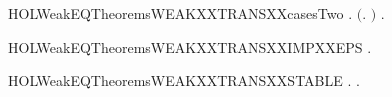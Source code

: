 \newcommand{\HOLWeakEQTheoremsWEAKXXTRANSXXcasesOne}{\UseVerbatim{HOLWeakEQTheoremsWEAKXXTRANSXXcasesOne}}
\begin{SaveVerbatim}{HOLWeakEQTheoremsWEAKXXTRANSXXcasesTwo}
\HOLTokenTurnstile{} \HOLSymConst{\HOLTokenForall{}}  .
        \HOLTokenWeakTransBegin{} \HOLTokenWeakTransEnd {} \HOLSymConst{\HOLTokenImp{}}
       \ensuremath{(}\HOLSymConst{\HOLTokenExists{}}.  \HOLTokenTransBegin\HOLConst{\ensuremath{\tau}}\HOLTokenTransEnd {} \HOLSymConst{\HOLTokenConj{}}  \HOLTokenWeakTransBegin{} \HOLTokenWeakTransEnd {}\ensuremath{)} \HOLSymConst{\HOLTokenDisj{}}
       \HOLSymConst{\HOLTokenExists{}}.  \HOLTokenTransBegin{} \HOLTokenTransEnd {} \HOLSymConst{\HOLTokenConj{}}   
\end{SaveVerbatim}
\newcommand{\HOLWeakEQTheoremsWEAKXXTRANSXXcasesTwo}{\UseVerbatim{HOLWeakEQTheoremsWEAKXXTRANSXXcasesTwo}}
\begin{SaveVerbatim}{HOLWeakEQTheoremsWEAKXXTRANSXXIMPXXEPS}
\HOLTokenTurnstile{} \HOLSymConst{\HOLTokenForall{}} .  \HOLTokenWeakTransBegin\HOLConst{\ensuremath{\tau}}\HOLTokenWeakTransEnd {} \HOLSymConst{\HOLTokenImp{}}   
\end{SaveVerbatim}
\newcommand{\HOLWeakEQTheoremsWEAKXXTRANSXXIMPXXEPS}{\UseVerbatim{HOLWeakEQTheoremsWEAKXXTRANSXXIMPXXEPS}}
\begin{SaveVerbatim}{HOLWeakEQTheoremsWEAKXXTRANSXXSTABLE}
\HOLTokenTurnstile{} \HOLSymConst{\HOLTokenForall{}}  .
        \HOLTokenWeakTransBegin{} \HOLTokenWeakTransEnd {} \HOLSymConst{\HOLTokenConj{}}   \HOLSymConst{\HOLTokenImp{}}
       \HOLSymConst{\HOLTokenExists{}}.  \HOLTokenTransBegin{} \HOLTokenTransEnd {} \HOLSymConst{\HOLTokenConj{}}   
\end{SaveVerbatim}
